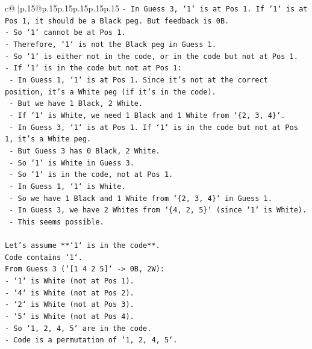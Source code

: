 \documentclass{article}
\begin{document}
{\begin{supertabular}{c@{$\;$}|p{.15\linewidth}@{}p{.15\linewidth}p{.15\linewidth}p{.15\linewidth}p{.15\linewidth}p{.15\linewidth}}
{{{\texttt{{-}   In Guess 3, `1` is at Pos 1. If `1` is at Pos 1, it should be a Black peg. But feedback is 0B.} \\
\texttt{{-}   So `1` cannot be at Pos 1.} \\
\texttt{{-}   Therefore, `1` is not the Black peg in Guess 1.} \\
\texttt{{-}   So `1` is either not in the code, or in the code but not at Pos 1.} \\
\texttt{{-}   If `1` is in the code but not at Pos 1:} \\
\texttt{    {-}   In Guess 1, `1` is at Pos 1. Since it's not at the correct position, it's a White peg (if it's in the code).} \\
\texttt{    {-}   But we have 1 Black, 2 White.} \\
\texttt{    {-}   If `1` is White, we need 1 Black and 1 White from `\{2, 3, 4\}`.} \\
\texttt{    {-}   In Guess 3, `1` is at Pos 1. If `1` is in the code but not at Pos 1, it's a White peg.} \\
\texttt{    {-}   But Guess 3 has 0 Black, 2 White.} \\
\texttt{    {-}   So `1` is White in Guess 3.} \\
\texttt{    {-}   So `1` is in the code, not at Pos 1.} \\
\texttt{    {-}   In Guess 1, `1` is White.} \\
\texttt{    {-}   So we have 1 Black and 1 White from `\{2, 3, 4\}` in Guess 1.} \\
\texttt{    {-}   In Guess 3, we have 2 Whites from `\{4, 2, 5\}` (since `1` is White).} \\
\texttt{    {-}   This seems possible.} \\
\\ 
\texttt{Let's assume **`1` is in the code**.} \\
\texttt{Code contains `1`.} \\
\texttt{From Guess 3 (`{[}1 4 2 5{]}` {-}> 0B, 2W):} \\
\texttt{{-}   `1` is White (not at Pos 1).} \\
\texttt{{-}   `4` is White (not at Pos 2).} \\
\texttt{{-}   `2` is White (not at Pos 3).} \\
\texttt{{-}   `5` is White (not at Pos 4).} \\
\texttt{{-}   So `1, 2, 4, 5` are in the code.} \\
\texttt{{-}   Code is a permutation of `1, 2, 4, 5`.} \\
}}}
\end{supertabular}}
\end{document}
